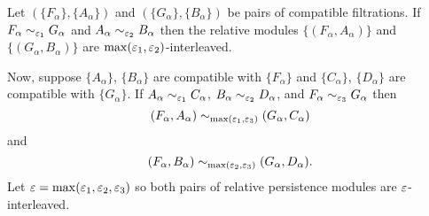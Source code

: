 \begin{theorem}
  Let $(\{F_\alpha\}, \{A_\alpha\})$ and $(\{G_\alpha\}, \{B_\alpha\})$ be pairs of compatible filtrations.
  If $F_\alpha\sim_{\varepsilon_1} G_\alpha$ and $A_\alpha\sim_{\varepsilon_2} B_\alpha$ then the relative modules $\{(F_\alpha, A_\alpha)\}$ and $\{(G_\alpha, B_\alpha)\}$ are $\max(\varepsilon_1, \varepsilon_2)$-interleaved.
\end{theorem}

Now, suppose $\{A_\alpha\}$, $\{B_\alpha\}$ are compatible with $\{F_\alpha\}$ and $\{C_\alpha\}$, $\{D_\alpha\}$ are compatible with $\{G_\alpha\}$.
If $A_\alpha\sim_{\varepsilon_1} C_\alpha$, $B_\alpha\sim_{\varepsilon_2} D_\alpha$, and $F_\alpha\sim_{\varepsilon_3} G_\alpha$ then
\[ (F_\alpha, A_\alpha)\sim_{\max(\varepsilon_1,\varepsilon_3)} (G_\alpha, C_\alpha)\]
and
\[ (F_\alpha, B_\alpha)\sim_{\max(\varepsilon_2,\varepsilon_3)} (G_\alpha, D_\alpha).\]
Let $\varepsilon = \max(\varepsilon_1, \varepsilon_2, \varepsilon_3)$ so both pairs of relative persistence modules are $\varepsilon$-interleaved.




